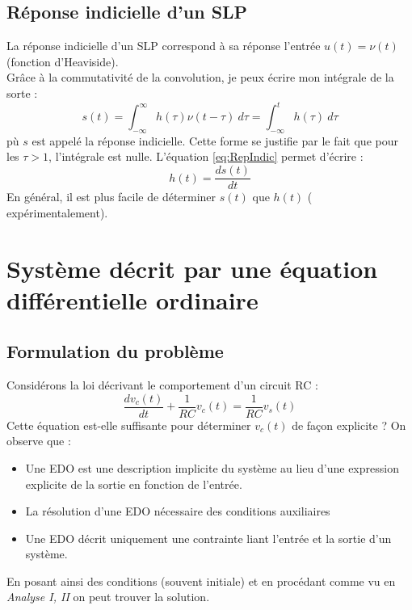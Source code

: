 	\subsection{Réponse indicielle d'un SLP}
	La réponse indicielle d'un SLP correspond à sa réponse l'entrée $u(t) = \nu
	(t)$ (fonction d'Heaviside).\\
	Grâce à la commutativité de la convolution, je peux écrire mon intégrale de
	la sorte :
	\begin{equation}
	s(t) = \int_{-\infty}^\infty h(\tau)\nu(t-\tau)\ d\tau = \int_{-\infty}^t h(
	\tau)\ d\tau
	\label{eq:RepIndic}
	\end{equation}
	pù $s$ est appelé la réponse indicielle. Cette forme se justifie par le fait que 
	pour les $\tau > 1$, l'intégrale est nulle. L'équation \autoref{eq:RepIndic} 
	permet d'écrire :
	\begin{equation}
	h(t) = \frac{ds(t)}{dt}
	\end{equation}
	En général, il est plus facile de déterminer $s(t)$ que $h(t)$ (
	expérimentalement).


\section{Système décrit par une équation différentielle ordinaire}
	\subsection{Formulation du problème}
	Considérons la loi décrivant le comportement d'un circuit RC :
	\begin{equation}
	\frac{dv_c(t)}{dt}+\frac{1}{RC}v_c(t) = \frac{1}{RC}v_s(t)
	\end{equation}		
	Cette équation est-elle suffisante pour déterminer $v_c(t)$ de façon 
	explicite ? On observe que :
	\begin{itemize}
	\item Une EDO est une description implicite du système au lieu d'une 
	expression explicite de la sortie en fonction de l'entrée.
	\item La résolution d'une EDO nécessaire des conditions auxiliaires
	\item Une EDO décrit uniquement une contrainte liant l'entrée et la
	sortie d'un système.
	\end{itemize}
	En posant ainsi des conditions (souvent initiale) et en procédant 
	comme vu en \textit{Analyse I, II} on peut trouver la solution.
	
